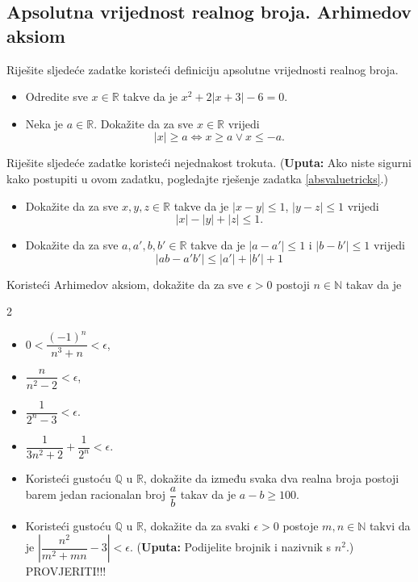 \subsection*{Apsolutna vrijednost realnog broja. Arhimedov aksiom}
\begin{exercise}{\unskip} Riješite sljedeće zadatke koristeći definiciju apsolutne vrijednosti realnog broja.
\begin{itemize}
\item[a)] Odredite sve $x\in \mathbb{R}$ takve da je $x^2+2\lvert x+3\rvert-6=0$.
\item[b)] Neka je $a\in \mathbb{R}$. Dokažite da za sve $x\in \mathbb{R}$ vrijedi
$$\lvert x\rvert\geq a \Leftrightarrow x\geq a \vee x\leq -a.$$
\end{itemize}
\end{exercise}
\begin{exercise}{\unskip} Riješite sljedeće zadatke koristeći nejednakost trokuta. (\textbf{Uputa:} Ako niste sigurni kako postupiti u ovom zadatku, pogledajte rješenje zadatka \ref{absvaluetricks}.)
\begin{itemize}
\item[a)] Dokažite da za sve $x, y, z\in \mathbb{R}$ takve da je $\lvert x-y\rvert\leq 1$, $\lvert y-z\rvert\leq 1$ vrijedi $$\lvert x\rvert-\lvert y\rvert+\lvert z\rvert\leq 1.$$
\item[b)] Dokažite da za sve $a, a', b, b'\in \mathbb{R}$ takve da je $\lvert a-a'\rvert\leq 1$ i $\lvert b-b'\rvert\leq 1$ vrijedi
$$\left\lvert ab-a'b'\right\rvert\leq \left\lvert a'\right\rvert+\left\lvert b'\right\rvert+1$$
\end{itemize}
\end{exercise}
\begin{exercise}{\unskip}
Koristeći Arhimedov aksiom, dokažite da za sve $\epsilon>0$ postoji $n\in \mathbb{N}$ takav da je
\begin{multicols}{2}
\begin{itemize}
\item[a)] $0<\dfrac{(-1)^n}{n^3+n}<\epsilon$,
\item[b)] $\dfrac{n}{n^2-2}<\epsilon$,
\item[c)] $\dfrac{1}{2^n-3}<\epsilon$.
\item[d)] $\dfrac{1}{3n^2+2}+\dfrac{1}{2^n}<\epsilon.$ 
\end{itemize}
\end{multicols}
\end{exercise}
\begin{exercise}{\unskip} \textbf{}
\begin{itemize}
\item[a)] Koristeći gustoću $\mathbb{Q}$ u $\mathbb{R}$, dokažite da između svaka dva realna broja postoji barem jedan racionalan broj $\dfrac{a}{b}$ takav da je $a-b\geq 100$.
\item[b)] Koristeći gustoću $\mathbb{Q}$ u $\mathbb{R}$, dokažite da za svaki $\epsilon>0$ postoje $m, n\in \mathbb{N}$ takvi da je $\left\lvert\dfrac{n^2}{m^2+mn}-3\right\rvert<\epsilon$. (\textbf{Uputa:} Podijelite brojnik i nazivnik s $n^2$.) PROVJERITI!!!
\end{itemize}
\end{exercise}
